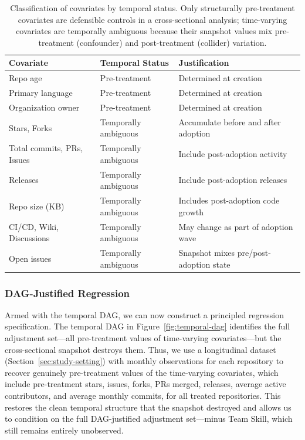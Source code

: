 \begin{table}[t]
\centering
\caption{Classification of covariates by temporal status.
Only structurally pre-treatment covariates are defensible controls in a cross-sectional analysis; time-varying covariates are temporally ambiguous because their snapshot values mix pre-treatment (confounder) and post-treatment (collider) variation.}
\label{tab:covariate-classification}
\small
\begin{tabular}{lll}
\toprule
Covariate & Temporal Status & Justification \\
\midrule
Repo age & Pre-treatment & Determined at creation \\
Primary language & Pre-treatment & Determined at creation \\
Organization owner & Pre-treatment & Determined at creation \\
\midrule
Stars, Forks & Temporally ambiguous & Accumulate before and after adoption \\
Total commits, PRs, Issues & Temporally ambiguous & Include post-adoption activity \\
Releases & Temporally ambiguous & Include post-adoption releases \\
Repo size (KB) & Temporally ambiguous & Includes post-adoption code growth \\
CI/CD, Wiki, Discussions & Temporally ambiguous & May change as part of adoption wave \\
Open issues & Temporally ambiguous & Snapshot mixes pre/post-adoption state \\
\bottomrule
\end{tabular}
\end{table}

\subsubsection{DAG-Justified Regression}
\label{sec:dag-justified}

Armed with the temporal DAG, we can now construct a principled regression specification.
The temporal DAG in Figure~\ref{fig:temporal-dag} identifies the full adjustment set---all pre-treatment values of time-varying covariates---but the cross-sectional snapshot destroys them.
Thus, we use a longitudinal dataset (Section~\ref{sec:study-setting}) with monthly observations for each repository to recover genuinely pre-treatment values of the time-varying covariates, which include pre-treatment stars, issues, forks, PRs merged, releases, average active contributors, and average monthly commits, for all treated repositories.
This restores the clean temporal structure that the snapshot destroyed and allows us to condition on the full DAG-justified adjustment set---minus Team Skill, which still remains entirely unobserved.

